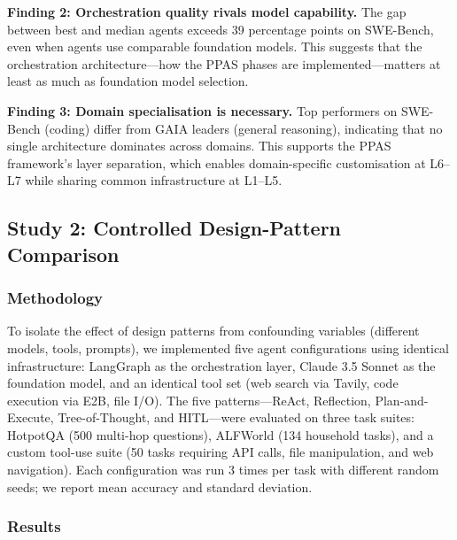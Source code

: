 \documentclass[review]{elsarticle}
\theoremstyle{definition}
\begin{document}
\textbf{Finding 2: Orchestration quality rivals model capability.} The gap between best and median agents exceeds 39 percentage points on SWE-Bench, even when agents use comparable foundation models. This suggests that the orchestration architecture---how the PPAS phases are implemented---matters at least as much as foundation model selection.

\textbf{Finding 3: Domain specialisation is necessary.} Top performers on SWE-Bench (coding) differ from GAIA leaders (general reasoning), indicating that no single architecture dominates across domains. This supports the PPAS framework's layer separation, which enables domain-specific customisation at L6--L7 while sharing common infrastructure at L1--L5.

\subsection{Study 2: Controlled Design-Pattern Comparison}\label{sec:pattern-eval}

\subsubsection{Methodology}

To isolate the effect of design patterns from confounding variables (different models, tools, prompts), we implemented five agent configurations using identical infrastructure: LangGraph \citep{langchain2024langgraph} as the orchestration layer, Claude 3.5 Sonnet \citep{anthropic2024claude} as the foundation model, and an identical tool set (web search via Tavily, code execution via E2B, file I/O). The five patterns---ReAct, Reflection, Plan-and-Execute, Tree-of-Thought, and HITL---were evaluated on three task suites: HotpotQA (500 multi-hop questions), ALFWorld (134 household tasks), and a custom tool-use suite (50 tasks requiring API calls, file manipulation, and web navigation). Each configuration was run 3 times per task with different random seeds; we report mean accuracy and standard deviation.

\subsubsection{Results}
\end{document}
